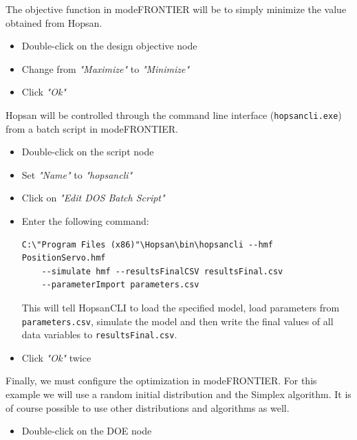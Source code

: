 \documentclass[a4paper]{article}
\begin{document}
\begin{tutenumerate}
The objective function in modeFRONTIER will be to simply minimize the value obtained from Hopsan.
\begin{itemize}
\item Double-click on the design objective node


\item Change from \textit{"Maximize"} to \textit{"Minimize"}
\item Click \textit{"Ok"}
\end{itemize}

\pagebreak

Hopsan will be controlled through the command line interface (\texttt{hopsancli.exe}) from a batch script in modeFRONTIER.
\begin{itemize}
\item Double-click on the script node


\item Set \textit{"Name"} to \textit{"hopsancli"}
\item Click on \textit{"Edit DOS Batch Script"}
\item Enter the following command:
\begin{lstlisting}[basicstyle=\footnotesize\ttfamily, breaklines=true]
C:\"Program Files (x86)"\Hopsan\bin\hopsancli --hmf PositionServo.hmf
    --simulate hmf --resultsFinalCSV resultsFinal.csv 
    --parameterImport parameters.csv
\end{lstlisting}
This will tell HopsanCLI to load the specified model, load parameters from \texttt{parameters.csv}, simulate the model and then write the final values of all data variables to \texttt{resultsFinal.csv}.
\item Click \textit{"Ok"} twice
\end{itemize}

Finally, we must configure the optimization in modeFRONTIER. For this example we will use a random initial distribution and the Simplex algorithm. It is of course possible to use other distributions and algorithms as well.
\begin{itemize}
\item Double-click on the DOE node


\end{itemize}
\end{tutenumerate}
\end{document}
